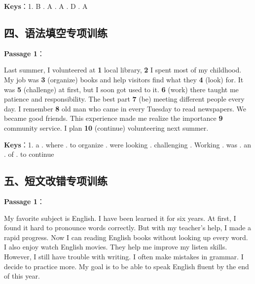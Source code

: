 \textbf{Keys}：1. B . A . A . D . A

\subsection{四、语法填空专项训练}

\textbf{Passage 1}：

Last summer, I volunteered at \textbf{1} \underline{\hspace{1cm}} local library, \textbf{2} \underline{\hspace{1cm}} I spent most of my childhood. My job was \textbf{3} \underline{\hspace{1cm}} (organize) books and help visitors find what they \textbf{4} \underline{\hspace{1cm}} (look) for. It was \textbf{5} \underline{\hspace{1cm}} (challenge) at first, but I soon got used to it. \textbf{6} \underline{\hspace{1cm}} (work) there taught me patience and responsibility. The best part \textbf{7} \underline{\hspace{1cm}} (be) meeting different people every day. I remember \textbf{8} \underline{\hspace{1cm}} old man who came in every Tuesday to read newspapers. We became good friends. This experience made me realize the importance \textbf{9} \underline{\hspace{1cm}} community service. I plan \textbf{10} \underline{\hspace{1cm}} (continue) volunteering next summer.

\textbf{Keys}：1. a . where . to organize . were looking . challenging . Working . was . an . of . to continue

\subsection{五、短文改错专项训练}

\textbf{Passage 1}：

\medskip

My favorite subject is English. I have been learned it for six years. At first, I found it hard to pronounce words correctly. But with my teacher's help, I made a rapid progress. Now I can reading English books without looking up every word. I also enjoy watch English movies. They help me improve my listen skills. However, I still have trouble with writing. I often make mistakes in grammar. I decide to practice more. My goal is to be able to speak English fluent by the end of this year.


